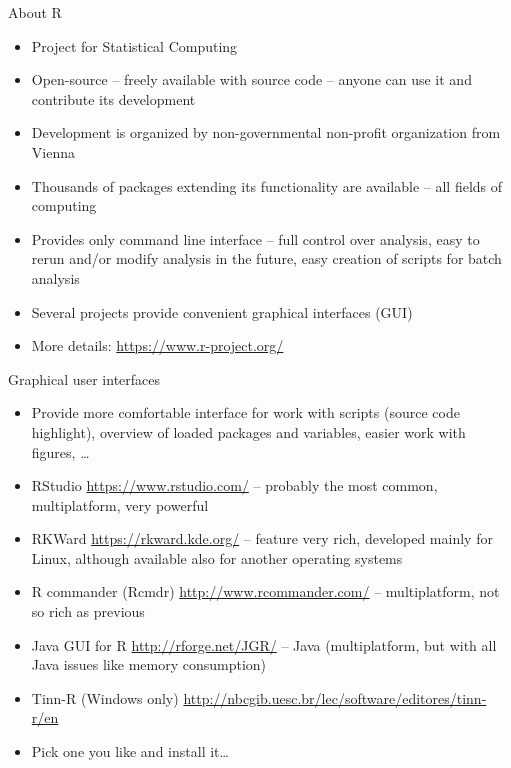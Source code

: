 \documentclass[compress, ucs, xelatex, 11pt, xcolor=svgnames,
  hyperref={
    bookmarks=true,
    unicode=true,
    colorlinks=true,
    pdftitle={Molecular data in R},
    plainpages=false,
    pdfauthor={Vojtech Zeisek},
    pdfsubject={Course about phylogeny and evolution in R},
    pdfcreator={XeLaTeX},
    pdfkeywords={R, evolution, phylogeny, molecular data},
    linkcolor=Tomato,
    anchorcolor=SaddleBrown,
    citecolor=Goldenrod,
    filecolor=DarkMagenta,
    menucolor=Sienna,
    urlcolor=DarkTurquoise,
    pdftex},
  url={hyphens, lowtilde} %
  ]{beamer}
\begin{document}
\begin{frame}{About R}
\begin{itemize}
 \item Project for Statistical Computing
 \item Open-source -- freely available with source code -- anyone can use it and contribute its development
 \item Development is organized by non-governmental non-profit organization from Vienna
 \item Thousands of packages extending its functionality are available -- all fields of computing
 \item Provides only command line interface -- full control over analysis, easy to rerun and/or modify analysis in the future, easy creation of scripts for batch analysis
 \item Several projects provide convenient graphical interfaces (GUI)
 \item More details: \url{https://www.r-project.org/}
\end{itemize}
\end{frame}

\begin{frame}{Graphical user interfaces}
\begin{itemize}
 \item Provide more comfortable interface for work with scripts (source code highlight), overview of loaded packages and variables, easier work with figures, \ldots
 \item RStudio \url{https://www.rstudio.com/} -- probably the most common, multiplatform, very powerful
 \item RKWard \url{https://rkward.kde.org/} -- feature very rich, developed mainly for Linux, although available also for another operating systems
 \item R commander (Rcmdr) \url{http://www.rcommander.com/} -- multiplatform, not so rich as previous
 \item Java GUI for R \url{http://rforge.net/JGR/} -- Java (multiplatform, but with all Java issues like memory consumption)
 \item Tinn-R (Windows only) \url{http://nbcgib.uesc.br/lec/software/editores/tinn-r/en}
 \item Pick one you like and install it\ldots
\end{itemize}
\end{frame}
\end{document}
